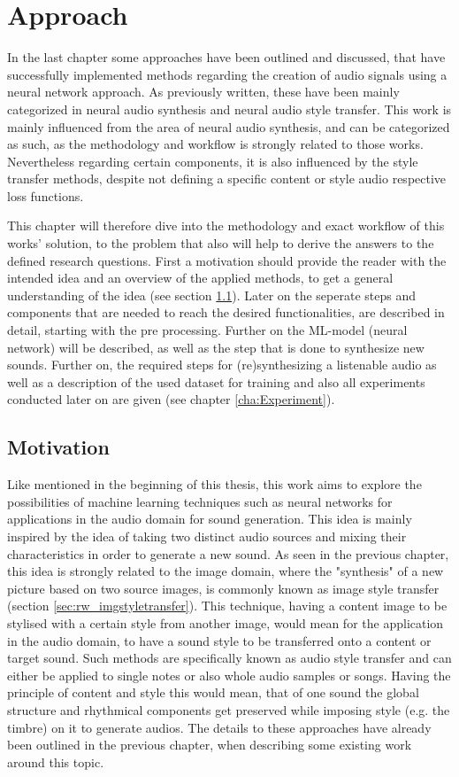 \chapter{Approach}
\label{cha:Approach}
In the last chapter some approaches have been outlined and discussed, that have successfully implemented methods regarding the creation of audio signals using a neural network approach. As previously written, these have been mainly categorized in neural audio synthesis and neural audio style transfer. This work is mainly influenced from the area of neural audio synthesis, and can be categorized as such, as the methodology and workflow is strongly related to those works. Nevertheless regarding certain components, it is also influenced by the style transfer methods, despite not defining a specific content or style audio respective loss functions.

This chapter will therefore dive into the methodology and exact workflow of this works' solution, to the problem that also will help to derive the answers to the defined research questions. First a motivation should provide the reader with the intended idea and an overview of the applied methods, to get a general understanding of the idea (see section \ref{sec:app_motivation}). Later on the seperate steps and components that are needed to reach the desired functionalities, are described in detail, starting with the pre processing. Further on the ML-model (neural network) will be described, as well as the step that is done to synthesize new sounds. Further on, the required steps for (re)synthesizing a listenable audio as well as a description of the used dataset for training and also all experiments conducted later on are given (see chapter \ref{cha:Experiment}).

\section{Motivation}
\label{sec:app_motivation}
Like mentioned in the beginning of this thesis, this work aims to explore the possibilities of machine learning techniques such as neural networks for applications in the audio domain for sound generation. This idea is mainly inspired by the idea of taking two distinct audio sources and mixing their characteristics in order to generate a new sound. As seen in the previous chapter, this idea is strongly related to the image domain, where the "synthesis" of a new picture based on two source images, is commonly known as image style transfer (section \ref{sec:rw_imgstyletransfer}). This technique, having a content image to be stylised with a certain style from another image, would mean for the application in the audio domain, to have a sound style to be transferred onto a content or target sound. Such methods are specifically known as audio style transfer and can either be applied to single notes or also whole audio samples or songs. Having the principle of content and style this would mean, that of one sound the global structure and rhythmical components get preserved while imposing style (e.g. the timbre) on it to generate audios. The details to these approaches have already been outlined in the previous chapter, when describing some existing work around this topic.

